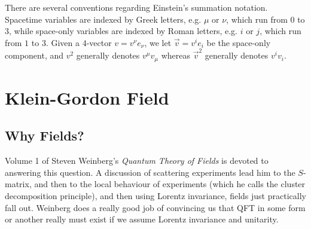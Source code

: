 \documentclass{report}
\theoremstyle{plain}
\theoremstyle{definition}
\theoremstyle{remark}
\begin{document}
There are several conventions regarding Einstein's summation notation.
Spacetime variables are indexed by Greek letters, e.g. $\mu$ or $\nu$,
which run from $0$ to $3$, while space-only variables are indexed by
Roman letters, e.g. $i$ or $j$, which run from $1$ to $3$. Given a
$4$-vector $v = v^\nu e_\nu$, we let $\vec{v} = v^i e_i$ be the
space-only component, and $v^2$ generally denotes $v^\mu v_\mu$
whereas $\vec{v}^2$ generally denotes $v^i v_i$.

\chapter{Klein-Gordon Field}
\section{Why Fields?}
    
    Volume 1 of Steven Weinberg's \emph{Quantum Theory of Fields} is
    devoted to answering this question. A discussion of scattering
    experiments lead him to the $S$-matrix, and then to the local behaviour
    of experiments (which he calls the cluster decomposition principle),
    and then using Lorentz invariance, fields just practically fall out.
    Weinberg does a really good job of convincing us that QFT in some form
    or another really must exist if we assume Lorentz invariance and
    unitarity.
%
\end{document}
